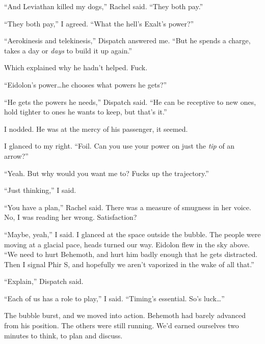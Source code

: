 ``And Leviathan killed my dogs,'' Rachel said.  ``They both pay.''



``They both pay,'' I agreed.  ``What the hell's Exalt's power?''



``Aerokinesis and telekinesis,'' Dispatch answered me.  ``But he spends a charge, takes a day or \emph{days} to build it up again.''



Which explained why he hadn't helped.  Fuck.



``Eidolon's power\ldots he chooses what powers he gets?''



``He gets the powers he needs,'' Dispatch said.  ``He can be receptive to new ones, hold tighter to ones he wants to keep, but that's it.''



I nodded.  He was at the mercy of his passenger, it seemed.



I glanced to my right.  ``Foil.  Can you use your power on just the \emph{tip} of an arrow?''



``Yeah.  But why would you want me to?  Fucks up the trajectory.''



``Just thinking,'' I said.



``You have a plan,'' Rachel said.  There was a measure of smugness in her voice.  No, I was reading her wrong.  Satisfaction?



``Maybe, yeah,'' I said.  I glanced at the space outside the bubble.  The people were moving at a glacial pace, heads turned our way.  Eidolon flew in the sky above.  ``We need to hurt Behemoth, and hurt him badly enough that he gets distracted.  Then I signal Phir S, and hopefully we aren't vaporized in the wake of all that.''



``Explain,'' Dispatch said.



``Each of us has a role to play,'' I said.  ``Timing's essential.  So's luck\ldots''



\blacksquare



The bubble burst, and we moved into action.  Behemoth had barely advanced from his position.  The others were still running.  We'd earned ourselves two minutes to think, to plan and discuss.



